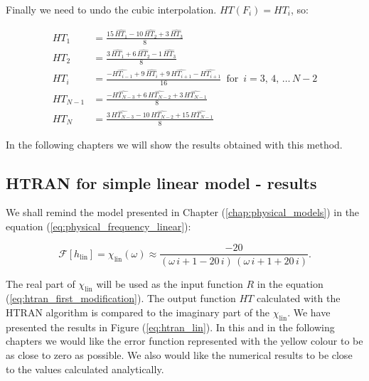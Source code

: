 \documentclass[12pt,twoside,a4paper]{article}
\numberwithin{equation}{subsection}
\numberwithin{figure}{subsection}
\begin{document}
Finally we need to undo the cubic interpolation. $ HT(F_i) = HT_{i} $, so: 

\begin{align}
  \label{eq:htundo_first}  
    HT_1       & = \frac {15 \, \widehat{HT_1} - 10 \, \widehat{HT_2} + 3 \, \widehat{HT_3}}{8}
    \\
  \label{eq:htundo_second}
    HT_2       & = \frac {3 \, \widehat{HT_1} + 6 \, \widehat{HT_2} - 1 \, \widehat{HT_3}}{8}
    \\ 
  \label{eq:htundo_next}
    HT_i       & = \frac { - \widehat{HT_{i - 1}} + 9 \, \widehat{HT_i} + 9 \, \widehat{HT_{i + 1}} - \widehat{ \mathit{HT}_{i + 1}} }
                   {16} \, \mbox{ for } \, i = 3, \, 4, \, \ldots \, {N - 2} 
    \\
  \label{eq:htundo_prelast}
    HT_{N - 1} & = \frac { - \widehat{HT_{N - 3}} + 6 \, \widehat{HT_{N - 2}} + 3 \, \widehat{HT_{N - 1}}}{8} 
    \\
  \label{eq:htundo_last}
    HT_N       & = \frac {3 \, \widehat{HT_{N - 3}} - 10 \, \widehat{HT_{N - 2}} + 15 \, \widehat{HT_{N - 1}}}{8}  
\end{align}

In the following chapters we will show the results obtained with this method.

\subsection{HTRAN for simple linear model - results} \label{chap:htran_lin}

We shall remind the model presented in Chapter (\ref{chap:physical_models}) in the equation (\ref{eq:physical_frequency_linear}):

\begin{equation} \label{eq:htran_remind_linmod}
  \mathcal{F}[h_{\text{lin}}] = \chi_{\text{lin}}(\omega) \approx \frac{ -20}{(\omega \,i + 1 -20\,i)\,(\omega \,i + 1 + 20\,i)} .
\end{equation}

The real part of $\chi_{\text{lin}}$ will be used as the input function $R$ in the equation (\ref{eq:htran_first_modification}). The
output function $HT$ calculated with the HTRAN algorithm is compared to the imaginary part of the $\chi_{\text{lin}}$. We have presented
the results in Figure (\ref{eq:htran_lin}). In this and in the following chapters we would like the error function
represented with the yellow colour to be as close to zero as possible. We also would like the numerical results to be close to the
values calculated analytically.
\end{document}
